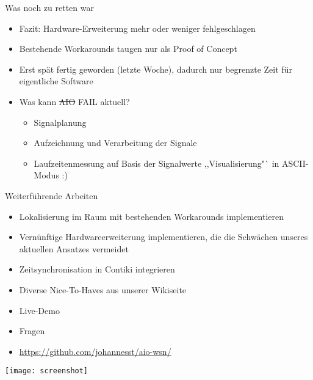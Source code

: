 \documentclass[fleqn,11pt]{beamer}
\begin{document}
      \begin{frame}{Was noch zu retten war}
	\begin{itemize}
	  \item	    Fazit: Hardware-Erweiterung mehr oder weniger fehlgeschlagen
	  \item Bestehende Workarounds taugen nur als Proof of Concept
	  \item   Erst spät fertig geworden (letzte Woche), dadurch nur
	           begrenzte  Zeit für eigentliche Software
		 \item Was kann \sout{AIO} FAIL aktuell?
		   \begin{itemize}
		     \item 	       Signalplanung
	          \item  Aufzeichnung und Verarbeitung der Signale
		  \item   Laufzeitenmessung auf Basis der Signalwerte
		        ,,Visualisierung"` in ASCII-Modus :)

	\end{itemize}
	\end{itemize}
      \end{frame}


      \begin{frame}{Weiterführende Arbeiten}
	\begin{itemize}
      \item Lokalisierung im Raum mit bestehenden Workarounds
	implementieren
      \item Vernünftige Hardwareerweiterung implementieren, die die
	Schwächen unseres aktuellen Ansatzes vermeidet
      \item Zeitsynchronisation in Contiki integrieren
      \item Diverse Nice-To-Haves aus unserer Wikiseite
    \end{itemize}
      \end{frame}
      \begin{frame}
	\begin{itemize} \Large
	  \item Live-Demo
	  \item Fragen
	  \item \url{https://github.com/johannesst/aio-wsn/}
	\end{itemize}
      \end{frame}
      \begin{frame}
	\begin{center}
	\texttt{[image: screenshot]}
      \end{center}
      \end{frame}
\end{document}
